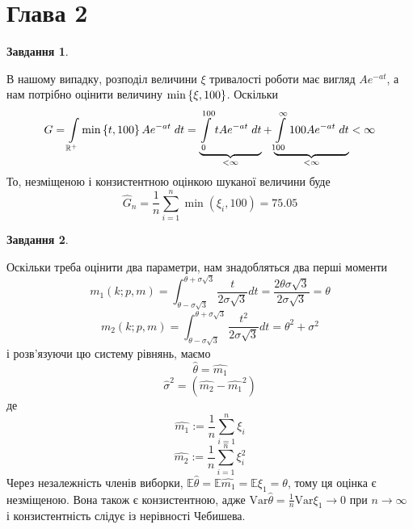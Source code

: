 \documentclass[12pt]{article} %
\newtheorem{prob}{Завдання}
\newcommand{\Var}{\mbox{Var}}
\begin{document}
\section{Глава 2}
\setcounter{prob}{21}
\begin{prob}\end{prob}
	В нашому випадку, розподіл величини $\xi$ тривалості роботи має вигляд $Ae^{-at}$, а нам потрібно оцінити величину $\min\mycbra{\xi,100}$.
	Оскільки
	\[G=\int_{\mathbb{R}^+}\min\mycbra{t,100}Ae^{-at}\;dt=\underbrace{\int_0^{100}tAe^{-at}\;dt}_{<\infty}+\underbrace{\int_{100}^\infty
	100Ae^{-at}\;dt}_{<\infty}<\infty\]
	То, незміщеною і конзистентною оцінкою шуканої величини буде
	\[\hat{G}_n=\frac{1}{n}\sum_{i=1}^n\min(\xi_i,100)=75.05\]
\begin{prob}\end{prob}
	Оскільки треба оцінити два параметри, нам знадобляться два перші моменти
	\[m_1(k;p,m)=\int_{\theta-\sigma\sqrt{3}}^{\theta+\sigma\sqrt{3}}\frac{t}{2\sigma\sqrt{3}}dt=\frac{2\theta\sigma\sqrt{3}}{2\sigma\sqrt{3}}=
	\theta\]
	\[m_2(k;p,m)=\int_{\theta-\sigma\sqrt{3}}^{\theta+\sigma\sqrt{3}}\frac{t^2}{2\sigma\sqrt{3}}dt=\theta^2+\sigma^2\]
	і розв’язуючи цю систему рівнянь, маємо
	\[\hat{{\theta}}=\hat{m_1}\]
	\[\hat{\sigma}^2=(\hat{m_2}-\hat{m_1}^2)\]
	де
	\[\hat{m_1}:=\frac{1}{n}\sum_{i=1}^n\xi_i\]
	\[\hat{m_2}:=\frac{1}{n}\sum_{i=1}^n\xi^2_i\]
	Через незалежність членів виборки, $\mathbb{E}\hat{\theta}=\mathbb{E}\hat{m_1}=\mathbb{E}\xi_1=\theta$, тому ця оцінка є незміщеною. Вона
	також є конзистентною, адже $\Var\hat{\theta}=\frac{1}{n}\Var\xi_1\to0$ при $n\to\infty$ і конзистентність слідує із нерівності Чебишева.
\end{document}
